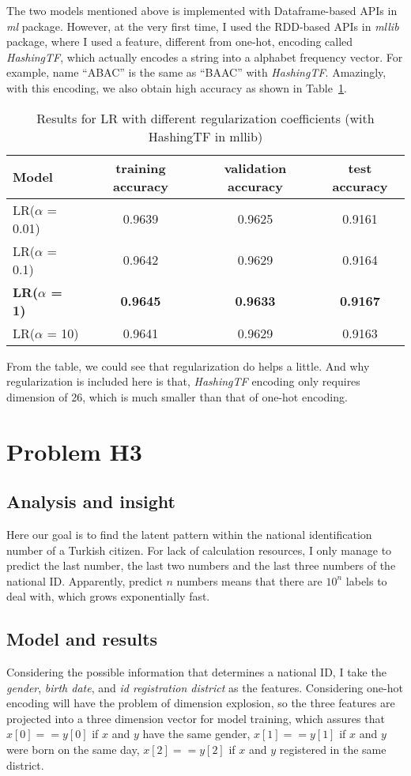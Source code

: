 \documentclass{article}
\begin{document}
The two models mentioned above is implemented with Dataframe-based APIs in \emph{ml} package. However, at the very first time, I used the RDD-based APIs in \emph{mllib} package, where I used a feature, different from one-hot, encoding called \emph{HashingTF}, which actually encodes a string into a alphabet frequency vector. For example, name ``ABAC'' is the same as ``BAAC'' with \emph{HashingTF}. Amazingly, with this encoding, we also obtain high accuracy as shown in Table~\ref{tab-4}.
\begin{table}[ht]
\centering
\caption{Results for LR with different regularization coefficients (with HashingTF in mllib)}
\label{tab-4}
\begin{tabular}{lccc}
\toprule
Model & training accuracy & validation accuracy & test accuracy \\
\midrule
LR($\alpha$ = 0.01) & 0.9639 & 0.9625 & 0.9161 \\
LR($\alpha$ = 0.1) & 0.9642 & 0.9629 & 0.9164 \\
\textbf{LR($\alpha$ = 1)} & \textbf{0.9645} & \textbf{0.9633} & \textbf{0.9167} \\
LR($\alpha$ = 10) & 0.9641 & 0.9629 & 0.9163 \\
\bottomrule
\end{tabular}
\end{table}

From the table, we could see that regularization do helps a little. And why regularization is included here is that, \emph{HashingTF} encoding only requires dimension of 26, which is much smaller than that of one-hot encoding.


\section{Problem H3}

\subsection{Analysis and insight}
Here our goal is to find the latent pattern within the national identification number of a Turkish citizen. For lack of calculation resources, I only manage to predict the last number, the last two numbers and the last three numbers of the national ID. Apparently, predict $n$ numbers means that there are $10^n$ labels to deal with, which grows exponentially fast.

\subsection{Model and results}
Considering the possible information that determines a national ID, I take the \emph{gender}, \emph{birth date}, and \emph{id registration district} as the features. Considering one-hot encoding will have the problem of dimension explosion, so the three features are projected into a three dimension vector for model training, which assures that $x[0] == y[0]$ if $x$ and $y$ have the same gender, $x[1] == y[1]$ if $x$ and $y$ were born on the same day, $x[2] == y[2]$ if $x$ and $y$ registered in the same district.
\end{document}
